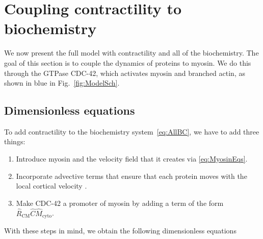 \documentclass[11pt]{article}
\newcommand{\6}[1]{#1_{\text{6}}}
\newcommand{\3}[1]{#1_{\text{3}}}
\begin{document}
\section{Coupling contractility to biochemistry \label{sec:WithMy}}
We now present the full model with contractility and all of the biochemistry. The goal of this section is to couple the dynamics of proteins to myosin. We do this through the GTPase CDC-42, which activates myosin and branched actin, as shown in blue in Fig.~\ref{fig:ModelSch}.

\subsection{Dimensionless equations}
To add contractility to the biochemistry system\ \eqref{eq:AllBC}, we have to add three things:
\begin{enumerate}
\item Introduce myosin and the velocity field that it creates via \eqref{eq:MyosinEqs}.
\item Incorporate advective terms that ensure that each protein moves with the local cortical velocity \cite{illukkumbura2023design}. 
\item Make CDC-42 a promoter of myosin by adding a term of the form $\hat R_\text{CM} \hat C \hat{M}_\text{cyto}$. 
\end{enumerate}
With these steps in mind, we obtain the following dimensionless equations
\end{document}
